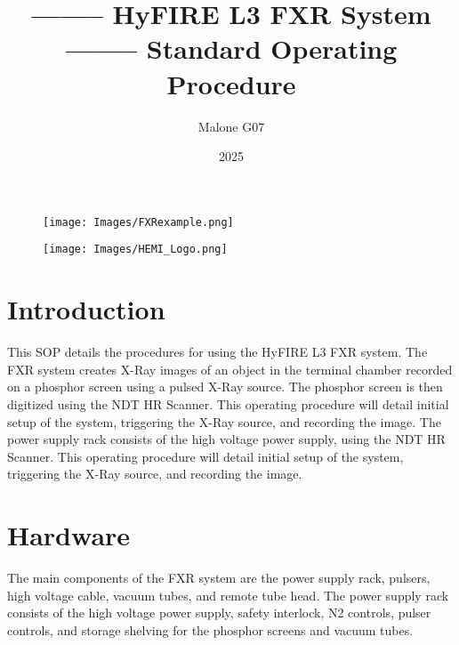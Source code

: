 \documentclass[11pt, twoside, a4paper]{article}
\begin{document}
\title{-------- HyFIRE L3 FXR System -------- Standard Operating Procedure}
\author{Malone G07}
\date{2025}
\maketitle

\begin{figure}
        \centering
        \texttt{[image: Images/FXRexample.png]}
    \end{figure}

\begin{figure}
    \begin{center}
        \texttt{[image: Images/HEMI\_Logo.png]}
    \end{center}
\end{figure}

\newpage
{}
\pagestyle{fancy}
\fancyfoot[C]{\thepage}
\tableofcontents
\newpage

\section{Introduction}
    This SOP details the procedures for using the HyFIRE L3 FXR system. The FXR system creates X-Ray images of an object in the 
terminal chamber recorded on a phosphor screen using a pulsed X-Ray source. The phosphor screen is then digitized
using the NDT HR Scanner. This operating procedure will detail initial setup of the system, triggering the X-Ray source, and recording the image. The power supply rack consists of the high voltage power supply, using the NDT HR Scanner. This operating procedure will detail initial setup of the system, triggering the X-Ray source, and recording the image. 

\section{Hardware}

The main components of the FXR system are the power supply rack, pulsers, high voltage cable, vacuum tubes, and remote tube head. The power supply rack consists of the high voltage power supply, safety interlock, N2 controls, pulser controls, and storage shelving for the phosphor screens and vacuum tubes.  
\end{document}
